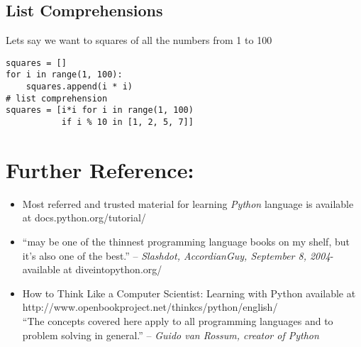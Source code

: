 \documentclass[12pt]{article}
\begin{document}
\subsection{List Comprehensions}
Lets say we want to squares of all the numbers from 1 to 100
\begin{verbatim}
squares = []
for i in range(1, 100):
    squares.append(i * i)
# list comprehension
squares = [i*i for i in range(1, 100)
           if i % 10 in [1, 2, 5, 7]]
\end{verbatim}
\newpage
\section{Further Reference:}
\begin{itemize}
  \item Most referred and trusted material for learning \emph{Python} language is available at docs.python.org/tutorial/
  \item ``may be one of the thinnest programming language books on my shelf, but it's also one of the best.'' -- \emph{Slashdot, AccordianGuy, September 8, 2004}- available at diveintopython.org/
  \item How to Think Like a Computer Scientist: Learning with Python available at http://www.openbookproject.net/thinkcs/python/english/ \\
    ``The concepts covered here apply to all programming languages and to problem solving in general.'' -- \emph{Guido van Rossum, creator of Python}
\end{itemize}
\end{document}
